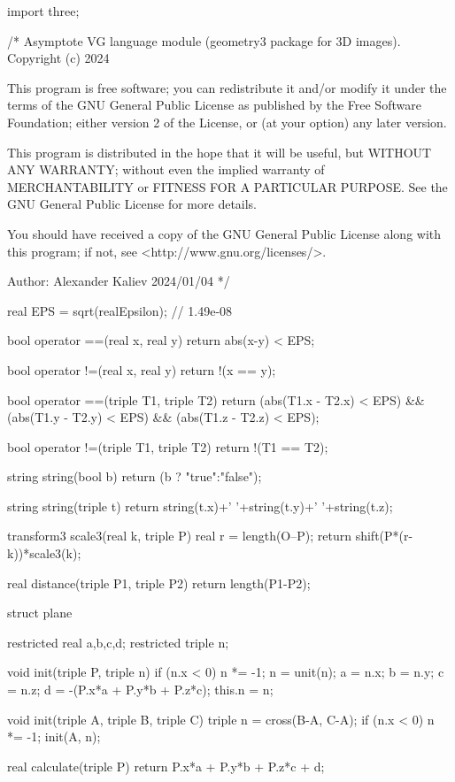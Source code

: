 import three;

/*
Asymptote VG language module (geometry3 package for 3D images).
Copyright (c) 2024

This program is free software; you can redistribute it and/or modify
it under the terms of the GNU General Public License as published by
the Free Software Foundation; either version 2 of the License, or
(at your option) any later version.

This program is distributed in the hope that it will be useful,
but WITHOUT ANY WARRANTY; without even the implied warranty of
MERCHANTABILITY or FITNESS FOR A PARTICULAR PURPOSE. See the
GNU General Public License for more details.

You should have received a copy of the GNU General Public License
along with this program; if not, see <http://www.gnu.org/licenses/>.

Author: Alexander Kaliev 2024/01/04
*/

real EPS = sqrt(realEpsilon); // \approx 1.49e-08

bool operator ==(real x, real y) {
	return abs(x-y) < EPS;
}

bool operator !=(real x, real y) {
	return !(x == y);
}

bool operator ==(triple T1, triple T2) {
	return (abs(T1.x - T2.x) < EPS) &&
      	   (abs(T1.y - T2.y) < EPS) &&
      	   (abs(T1.z - T2.z) < EPS);
}

bool operator !=(triple T1, triple T2) {
	return !(T1 == T2);
}

string string(bool b) {
	return (b ? "true":"false");
}

string string(triple t) {
	return string(t.x)+' '+string(t.y)+' '+string(t.z);
}

transform3 scale3(real k, triple P) {
	real r = length(O--P);
  	return shift(P*(r-k))*scale3(k);
}


real distance(triple P1, triple P2) {
	return length(P1-P2);
}


struct plane {
	restricted real a,b,c,d;
  	restricted triple n;
  
  	void init(triple P, triple n) {
        if (n.x < 0) n *= -1;
      	n = unit(n);
    	a = n.x;
      	b = n.y;
      	c = n.z;
      	d = -(P.x*a + P.y*b + P.z*c);
      	this.n = n;
    }
  
  	void init(triple A, triple B, triple C) {
    	triple n = cross(B-A, C-A);
      	if (n.x < 0) n *= -1;
      	init(A, n);
    }
  
  	real calculate(triple P) {
    	return P.x*a + P.y*b + P.z*c + d;
    }
}

